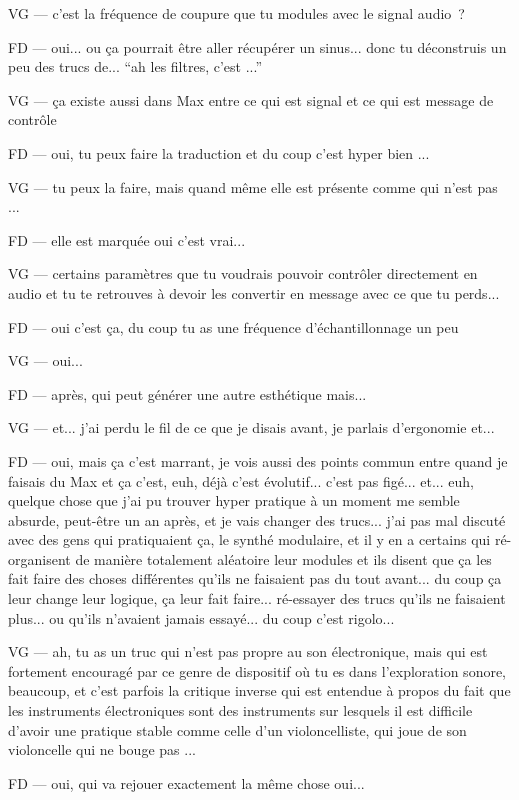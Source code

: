VG — c'est la fréquence de coupure que tu modules avec le signal audio ? 

FD — oui... ou ça pourrait être aller récupérer un sinus... donc tu déconstruis un peu des trucs de... ``ah les filtres, c'est ...''   

VG — ça existe aussi dans Max entre ce qui est signal et ce qui est message de contrôle 

FD — oui, tu peux faire la traduction et du coup c'est hyper bien ... 

VG — tu peux la faire, mais quand même elle est présente comme qui n'est pas ... 

FD — elle est marquée oui c'est vrai... 

VG — certains paramètres que tu voudrais pouvoir contrôler directement en audio et tu te retrouves à devoir les convertir en message avec ce que tu perds... 

FD — oui c'est ça, du coup tu as une fréquence d'échantillonnage un peu 

VG — oui... 

FD — après, qui peut générer une autre esthétique mais... 

VG — et... j'ai perdu le fil de ce que je disais avant, je parlais d'ergonomie et... 

FD — oui, mais ça c'est marrant, je vois aussi des points commun entre quand je faisais du Max et ça c'est, euh, déjà c'est évolutif... c'est pas figé... et... euh, quelque chose que j'ai pu trouver hyper pratique à un moment me semble absurde, peut-être un an après, et je vais changer des trucs... j'ai pas mal discuté avec des gens qui pratiquaient ça, le synthé modulaire, et il y en a certains qui ré-organisent de manière totalement aléatoire leur modules et ils disent que ça les fait  faire des choses différentes qu'ils ne faisaient pas du tout avant... du coup ça leur change leur logique, ça leur fait faire... ré-essayer des trucs qu'ils ne faisaient plus... ou qu'ils n'avaient jamais essayé... du coup c'est rigolo... 

VG — ah, tu as un truc qui n'est pas propre au son électronique, mais qui est fortement encouragé par ce genre de dispositif où tu es dans l'exploration sonore, beaucoup, et c'est parfois la critique inverse qui est entendue à propos du fait que les instruments électroniques sont des instruments sur lesquels il est difficile d'avoir une pratique stable comme celle d'un violoncelliste, qui joue de son violoncelle qui ne bouge pas ... 

FD — oui, qui va rejouer exactement la même chose oui... 

